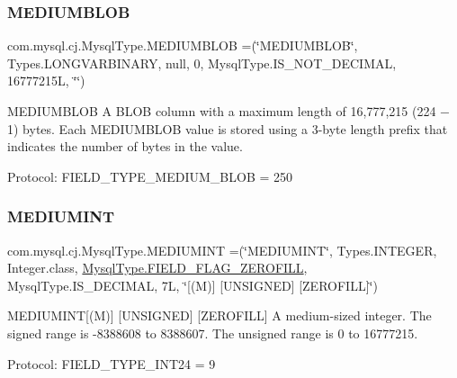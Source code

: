 \subsubsection{\texorpdfstring{M\+E\+D\+I\+U\+M\+B\+L\+OB}{MEDIUMBLOB}}
{\footnotesize\ttfamily com.\+mysql.\+cj.\+Mysql\+Type.\+M\+E\+D\+I\+U\+M\+B\+L\+OB =(\char`\"{}M\+E\+D\+I\+U\+M\+B\+L\+OB\char`\"{}, Types.\+L\+O\+N\+G\+V\+A\+R\+B\+I\+N\+A\+RY, null, 0, Mysql\+Type.\+I\+S\+\_\+\+N\+O\+T\+\_\+\+D\+E\+C\+I\+M\+AL, 16777215\+L, \char`\"{}\char`\"{})}

M\+E\+D\+I\+U\+M\+B\+L\+OB A B\+L\+OB column with a maximum length of 16,777,215 (224 − 1) bytes. Each M\+E\+D\+I\+U\+M\+B\+L\+OB value is stored using a 3-\/byte length prefix that indicates the number of bytes in the value.

Protocol\+: F\+I\+E\+L\+D\+\_\+\+T\+Y\+P\+E\+\_\+\+M\+E\+D\+I\+U\+M\+\_\+\+B\+L\+OB = 250 \mbox{\label{enumcom_1_1mysql_1_1cj_1_1_mysql_type_ab95197c592f1fbd01abed94679b373ca}} 
\subsubsection{\texorpdfstring{M\+E\+D\+I\+U\+M\+I\+NT}{MEDIUMINT}}
{\footnotesize\ttfamily com.\+mysql.\+cj.\+Mysql\+Type.\+M\+E\+D\+I\+U\+M\+I\+NT =(\char`\"{}M\+E\+D\+I\+U\+M\+I\+NT\char`\"{}, Types.\+I\+N\+T\+E\+G\+ER, Integer.\+class, \mbox{\hyperlink{enumcom_1_1mysql_1_1cj_1_1_mysql_type_abb76a1f2f3dac9a30d1b559b8ba66a48}{Mysql\+Type.\+F\+I\+E\+L\+D\+\_\+\+F\+L\+A\+G\+\_\+\+Z\+E\+R\+O\+F\+I\+LL}}, Mysql\+Type.\+I\+S\+\_\+\+D\+E\+C\+I\+M\+AL, 7\+L, \char`\"{}\mbox{[}(\+M)\mbox{]} \mbox{[}\+U\+N\+S\+I\+G\+N\+E\+D\mbox{]} \mbox{[}\+Z\+E\+R\+O\+F\+I\+L\+L\mbox{]}\char`\"{})}

M\+E\+D\+I\+U\+M\+I\+NT\mbox{[}(M)\mbox{]} \mbox{[}U\+N\+S\+I\+G\+N\+ED\mbox{]} \mbox{[}Z\+E\+R\+O\+F\+I\+LL\mbox{]} A medium-\/sized integer. The signed range is -\/8388608 to 8388607. The unsigned range is 0 to 16777215.

Protocol\+: F\+I\+E\+L\+D\+\_\+\+T\+Y\+P\+E\+\_\+\+I\+N\+T24 = 9 \mbox{\label{enumcom_1_1mysql_1_1cj_1_1_mysql_type_a92af70931d9dd83d1457ba82ff3f46fc}} 
